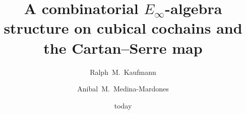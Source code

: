 \documentclass{amsart}
\title[A combinatorial $E_\infty$-algebra structure on cubical cochains]{A combinatorial $E_\infty$-algebra structure on cubical cochains and the Cartan--Serre map}
\author[R.~Kaufmann]{Ralph~M.~Kaufmann}
\author[A.~Medina-Mardones]{Anibal~M.~Medina-Mardones}
\date{today}
\begin{document}
%	
	
	\maketitle
	
%	
%	
%	
%	
%	
	\sloppy
	\printbibliography
\end{document}
